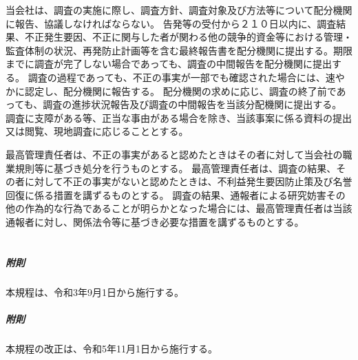 \documentclass[10pt,a4paper,uplatex]{jsarticle}
\begin{document}
当会社は、調査の実施に際し、調査方針、調査対象及び方法等について配分機関に報告、協議しなければならない。
\term 告発等の受付から２１０日以内に、調査結果、不正発生要因、不正に関与した者が関わる他の競争的資金等における管理・監査体制の状況、再発防止計画等を含む最終報告書を配分機関に提出する。期限までに調査が完了しない場合であっても、調査の中間報告を配分機関に提出する。
\term 調査の過程であっても、不正の事実が一部でも確認された場合には、速やかに認定し、配分機関に報告する。
\term 配分機関の求めに応じ、調査の終了前であっても、調査の進捗状況報告及び調査の中間報告を当該分配機関に提出する。
\term 調査に支障がある等、正当な事由がある場合を除き、当該事案に係る資料の提出又は閲覧、現地調査に応じることとする。

最高管理責任者は、不正の事実があると認めたときはその者に対して当会社の職業規則等に基づき処分を行うものとする。
\term 最高管理責任者は、調査の結果、その者に対して不正の事実がないと認めたときは、不利益発生要因防止策及び名誉回復に係る措置を講ずるものとする。
\term 調査の結果、通報者による研究妨害その他の作為的な行為であることが明らかとなった場合には、最高管理責任者は当該通報者に対し、関係法令等に基づき必要な措置を講ずるものとする。\\
\\
\subparagraph{附則} 本規程は、令和3年9月1日から施行する。
\subparagraph{附則} 本規程の改正は、令和5年11月1日から施行する。
\end{document}
